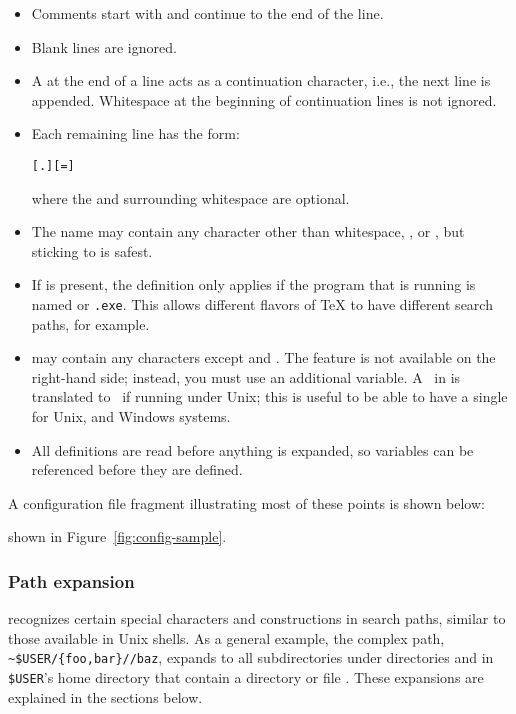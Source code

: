 \documentclass{article}
\begin{document}
\begin{itemize}
\item 
  Comments start with \code{\%} and continue to the end of the line.
\item 
  Blank lines are ignored.
\item
  A \bs{} at the end of a line acts as a continuation character,
  i.e., the next line is appended.  Whitespace at the beginning of
  continuation lines is not ignored.
\item 
  Each remaining line has the form:
\begin{alltt}
  [.] [=] 
\end{alltt}%
  where the \samp{=} and surrounding whitespace are optional.
\item 
  The  name may contain any character other
  than whitespace, \samp{=}, or , but sticking to
   is safest.
\item 
  If  is present, the definition only
  applies if the program that is running is named
  \texttt{} or \texttt{.exe}.  This allows
  different flavors of \TeX{} to have different search paths, for
  example.
\item {} may contain any characters except
  \code{\%} and .  The
   feature is not available on the
  right-hand side; instead, you must use an additional variable.  A
  \samp{;}\ in  is translated to \samp{:}\ if
  running under Unix; this is useful to be able to have a single
   for Unix,  and Windows systems.
\item 
  All definitions are read before anything is expanded, so
  variables can be referenced before they are defined.
\end{itemize}
A configuration file fragment illustrating most of these points is
\ifSingleColumn
shown below:


\else
shown in Figure~\ref{fig:config-sample}.
\fi

\subsubsection{Path expansion}
\label{Path-expansion}


\KPS{} recognizes certain special characters and constructions in
search paths, similar to those available in Unix shells.  As a
general example, the  complex path,
\verb+~$USER/{foo,bar}//baz+, expands to all subdirectories under
directories  and  in \texttt{\$USER}'s home
directory that contain a directory or file .  These
expansions are explained in the sections below.
\end{document}
